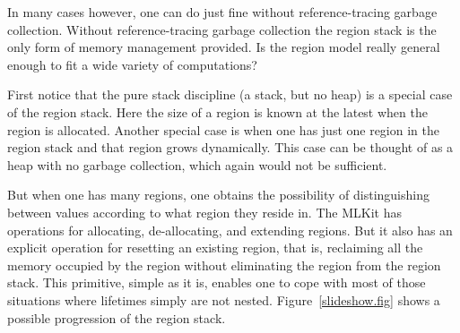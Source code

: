 \documentclass[12pt]{book}
\begin{document}
In many cases however, one can do just fine without reference-tracing
garbage collection. Without reference-tracing garbage collection the
region stack is the only form of memory management provided. Is the
region model really general enough to fit a wide variety of
computations?

First notice that the pure 
%
stack discipline (a stack, but no heap) is a special case of the
region stack. Here the size of a region is known at the latest when
the region is allocated. Another special case is when one has just one
region in the region stack and that region grows dynamically.  This
case can be thought of as a 
%
heap with no garbage collection, which again would not be sufficient.

But when one has many regions, one obtains the possibility of
distinguishing between values according to what region they reside in.
The MLKit has operations for allocating, de-allocating, and extending
regions. But it also has an explicit operation for
%
resetting an existing region, that is, reclaiming all the memory
occupied by the region without eliminating the region from the region
stack.  This primitive, simple as it is, enables one to cope with most
of those situations where lifetimes simply are not nested.
Figure~\ref{slideshow.fig} shows a possible progression of the region
stack.
\end{document}
